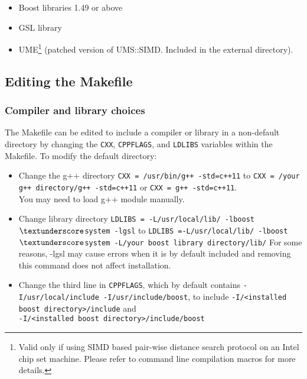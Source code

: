 \documentclass[11pt, oneside]{article}   	%
\begin{document}
\begin{itemize}
\item Boost libraries 1.49 or above
\item  GSL library
\item UME\footnote{Valid only if using SIMD based pair-wise distance search protocol on an Intel chip set machine. Please refer to command line compilation macros for more details.} (patched version of UMS::SIMD. Included in the external directory).
\end{itemize} 

\subsection{Editing the Makefile}

\subsubsection{Compiler and library choices}

The Makefile can be edited to include a compiler or library in a non-default directory by changing the \texttt{CXX}, \texttt{CPPFLAGS}, and \texttt{LDLIBS} variables within the Makefile. To modify the default directory: \\

\begin{itemize}
\item Change the g++ directory \texttt{CXX = /usr/bin/g++ -std=c++11} to
 	    \texttt{CXX = /your g++ directory/g++ -std=c++11} or \texttt{CXX = g++ -std=c++11}.\\
You may need to load g++ module manually.\\
\item Change library directory \texttt{LDLIBS = -L/usr/local/lib/ -lboost$\textunderscore$system -lgsl} to 
		\texttt{LDLIBS =-L/usr/local/lib/ -lboost$\textunderscore$system -L/your boost library directory/lib/} 
		For some reasons, -lgsl may cause errors when it is by default included and removing this command does not affect installation. \\
\item Change the third line in \texttt{CPPFLAGS}, which by default contains \texttt{-I/usr/local/include -I/usr/include/boost}, to include 
		\texttt{-I/<installed boost directory>/include} and \\ \texttt{-I/<installed boost directory>/include/boost}

\end{itemize}		
		
\end{document}
